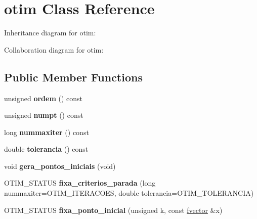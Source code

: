\hypertarget{classotim}{}\section{otim Class Reference}
\label{classotim}


Inheritance diagram for otim\+:


Collaboration diagram for otim\+:
\subsection*{Public Member Functions}
\begin{DoxyCompactItemize}
\item 
unsigned {\bfseries ordem} () const \hypertarget{classotim_a06214caa2a31f4ee7458f1ca9c5a3f80}{}\label{classotim_a06214caa2a31f4ee7458f1ca9c5a3f80}

\item 
unsigned {\bfseries numpt} () const \hypertarget{classotim_a327d74c08c9efaffc5292d9985bd94ca}{}\label{classotim_a327d74c08c9efaffc5292d9985bd94ca}

\item 
long {\bfseries nummaxiter} () const \hypertarget{classotim_a71a99f8523eb2f54aed821d3d228910c}{}\label{classotim_a71a99f8523eb2f54aed821d3d228910c}

\item 
double {\bfseries tolerancia} () const \hypertarget{classotim_a9d51bc24919c83e30b0d9aac67a1a947}{}\label{classotim_a9d51bc24919c83e30b0d9aac67a1a947}

\item 
void {\bfseries gera\+\_\+pontos\+\_\+iniciais} (void)\hypertarget{classotim_a1abbb077f5583701cd32216ab92356f9}{}\label{classotim_a1abbb077f5583701cd32216ab92356f9}

\item 
O\+T\+I\+M\+\_\+\+S\+T\+A\+T\+US {\bfseries fixa\+\_\+criterios\+\_\+parada} (long nummaxiter=O\+T\+I\+M\+\_\+\+I\+T\+E\+R\+A\+C\+O\+ES, double tolerancia=O\+T\+I\+M\+\_\+\+T\+O\+L\+E\+R\+A\+N\+C\+IA)\hypertarget{classotim_ac5588031d5f55f8b8c6cf4a3db7ed532}{}\label{classotim_ac5588031d5f55f8b8c6cf4a3db7ed532}

\item 
O\+T\+I\+M\+\_\+\+S\+T\+A\+T\+US {\bfseries fixa\+\_\+ponto\+\_\+inicial} (unsigned k, const \hyperlink{classfvector}{fvector} \&x)\hypertarget{classotim_a1e5d27e6a44e26fa5bccddd14351c534}{}\label{classotim_a1e5d27e6a44e26fa5bccddd14351c534}


\end{DoxyCompactItemize}
